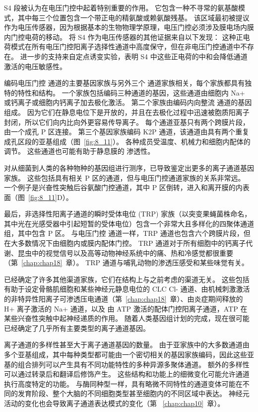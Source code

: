 S4 段被认为在电压门控中起着特别重要的作用。
它包含一种不寻常的氨基酸模式，其中每三个位置包含一个带正电的精氨酸或赖氨酸残基。
该区域最初被提议作为电压传感器，因为根据基本的生物物理学原理，电压门控必须涉及膜电场内膜内门控电荷的移动。
将 S4 作为电压传感器的其他证据来自以下发现：
这种正电荷模式在所有电压门控阳离子选择性通道中高度保守，但在非电压门控通道中不存在。
进一步的支持来自定点诱变实验，表明 S4 中这些正电荷的中和会降低通道激活的电压敏感性。


编码电压门控  通道的主要基因家族与另外三个  通道家族相关，每个家族都具有独特的特性和结构。
一个家族包括编码三种通道的基因，这些通道由细胞内 Na+ 或钙离子或细胞内钙离子加去极化激活。
第二个家族由编码内向整流  通道的基因组成。
因为它们在静息电位下是开放的，并且在去极化过程中迅速被胞质阳离子封闭，所以它们向内比向外更容易传导离子。
每个通道亚基只有两个跨膜片段，由一个成孔 P 区连接。
第三个基因家族编码 K2P 通道，该通道由具有两个重复成孔区段的亚基组成（图~\ref{fig:8_11}）。
各种成员受温度、机械力和细胞内配体的调节。
这些通道也可能有助于静息膜的  渗透性。


对从细菌到人类的各种物种的基因组进行测序，已导致鉴定出更多的离子通道基因家族。
这些包括具有相关 P 区的通道，但与电压门控通道家族的关系非常远。
一个例子是兴奋性突触后谷氨酸门控通道，其中 P 区倒转，进入和离开膜的内表面（图~\ref{fig:8_11}D）。


最后，非选择性阳离子通道的瞬时受体电位 (TRP) 家族（以突变果蝇菌株命名，其中光在光感受器中引起短暂的受体电位）包含一个非常大且多样化的四聚体通道组，其中包含 P 区。
与电压门控  通道一样，TRP 通道也包含六个跨膜片段，但在大多数情况下由细胞内或膜内配体门控。
TRP 通道对于所有细胞中的钙离子代谢、昆虫中的视觉信号以及高等动物神经系统中的痛、热和冷感觉都很重要（第~\ref{chap:chap18}~章）。
TRP 通道与哺乳动物的渗透压感受和某些味觉有关。


已经确定了许多其他渠道家族，它们在结构上与之前考虑的渠道无关。
这些包括有助于设定骨骼肌细胞和某些神经元静息电位的 CLC Cl- 通道、由机械刺激激活的非特异性阳离子可渗透压电通道（第~\ref{chap:chap18}~章）、由炎症期间释放的 H+ 离子激活的 Na+ 通道，以及 由 ATP 激活的配体门控阳离子通道，ATP 在某些兴奋性突触中起神经递质的作用。
随着人类基因组计划的完成，现在很可能已经确定了几乎所有主要类型的离子通道基因。


离子通道的多样性甚至大于离子通道基因的数量。
由于亚家族中的大多数通道由多个亚基组成，其中每种类型都可能由一个密切相关的基因家族编码，因此这些亚基的组合排列可以产生具有不同功能特性的多种异源多聚体通道。
额外的多样性可以通过转录后和翻译后修饰产生。
这些结构和功能上的细微变化可能允许通道执行高度特定的功能。
与酶同种型一样，具有略微不同特性的通道变体可能在不同的发育阶段、整个大脑的不同细胞类型甚至细胞内的不同区域中表达。
神经元活动的变化也会导致离子通道表达模式的变化（第 ~\ref{chap:chap10}~章）。



